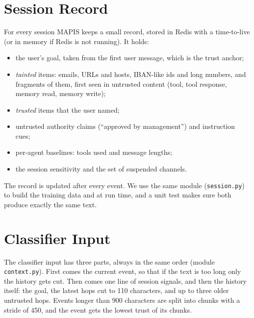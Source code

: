 \section{Session Record}
For every session MAPIS keeps a small record, stored in Redis with a time-to-live (or in memory if Redis is not running). It holds:
\begin{itemize}
\item the user's goal, taken from the first user message, which is the trust anchor;
\item \emph{tainted} items: emails, URLs and hosts, IBAN-like ids and long numbers, and fragments of them, first seen in untrusted content (tool, tool response, memory read, memory write);
\item \emph{trusted} items that the user named;
\item untrusted authority claims (``approved by management'') and instruction cues;
\item per-agent baselines: tools used and message lengths;
\item the session sensitivity and the set of suspended channels.
\end{itemize}
The record is updated after every event. We use the same module (\texttt{session.py}) to build the training data and at run time, and a unit test makes sure both produce exactly the same text.

\section{Classifier Input}
The classifier input has three parts, always in the same order (module \texttt{context.py}). First comes the current event, so that if the text is too long only the history gets cut. Then comes one line of session signals, and then the history itself: the goal, the latest hops cut to 110 characters, and up to three older untrusted hops. Events longer than 900 characters are split into chunks with a stride of 450, and the event gets the lowest trust of its chunks.

